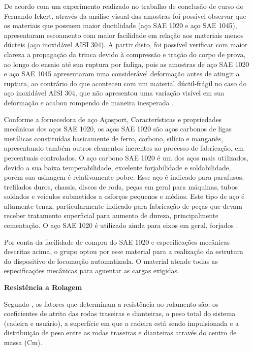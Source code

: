	De acordo com um experimento realizado no trabalho de conclusão de curso do Fernando Ickert, através da análise visual das amostras foi possível observar que os materiais que possuem maior ductilidade (aço SAE 1020 e aço SAE 1045), apresentaram escoamento com maior facilidade em relação aos materiais menos dúcteis (aço inoxidável AISI 304). A partir disto, foi possível verificar com maior clareza a propagação da trinca devido à compressão e tração do corpo de prova, ao longo do ensaio até sua ruptura por fadiga, pois as amostras de aço SAE 1020 e aço SAE 1045 apresentaram uma considerável deformação antes de atingir a ruptura, ao contrário do que aconteceu com um material dúctil-frágil no caso do aço inoxidável AISI 304, que não apresentou uma variação visível em sua deformação e acabou rompendo de maneira inesperada \cite{ensaio_fadiga}.

	Conforme a fornecedora de aço Açosport, Características e propriedades mecânicas dos aços SAE 1020, os aços SAE 1020 são aços carbonos de ligas metálicas constituídas basicamente de ferro, carbono, silício e manganês, apresentando também outros elementos inerentes ao processo de fabricação, em percentuais controlados. O aço carbono SAE 1020 é um dos aços mais utilizados, devido a sua baixa temperabilidade, excelente forjabilidade e soldabilidade, porém sua usinagem é relativamente pobre. Esse aço é indicado para parafusos, trefilados duros, chassis, discos de roda, peças em geral para máquinas, tubos soldados e veículos submetidos a esforços pequenos e médios. Este tipo de aço é altamente tenaz, particularmente indicado para fabricação de peças que devam receber tratamento superficial para aumento de dureza, principalmente cementação. O aço SAE 1020 é utilizado ainda para eixos em geral, forjados \cite{acosport}.

	Por conta da facilidade de compra do SAE 1020 e especificações mecânicas descritas acima, o grupo optou por esse material para a realização da estrutura do dispositivo de locomoção automatizada. O material atende todas as especificações mecânicas para aguentar as cargas exigidas.

	\textbf{Resistência a Rolagem}

	Segundo \cite{propulsao_cadeira}, os fatores que determinam a resistência ao rolamento são: os coeficientes de atrito das rodas traseiras e dianteiras, o peso total do sistema (cadeira e usuário), a superfície em que a cadeira está sendo impulsionada e a distribuição de peso entre as rodas traseiras e dianteiras através do centro de massa (Cm).

